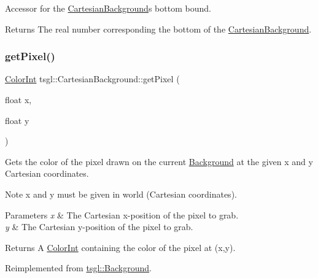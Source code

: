 Accessor for the \hyperlink{classtsgl_1_1_cartesian_background}{Cartesian\+Background}\textquotesingle{}s bottom bound. 

\begin{DoxyReturn}{Returns}
The real number corresponding the bottom of the \hyperlink{classtsgl_1_1_cartesian_background}{Cartesian\+Background}. 
\end{DoxyReturn}
\mbox{\label{classtsgl_1_1_cartesian_background_a36a3e803d2ffe16e2e1639359f7c7be5}} 
\subsubsection{\texorpdfstring{get\+Pixel()}{getPixel()}}
{\footnotesize\ttfamily \hyperlink{structtsgl_1_1_color_int}{Color\+Int} tsgl\+::\+Cartesian\+Background\+::get\+Pixel (\begin{DoxyParamCaption}\item[{float}]{x,  }\item[{float}]{y }\end{DoxyParamCaption})\hspace{0.3cm}{\ttfamily [virtual]}}



Gets the color of the pixel drawn on the current \hyperlink{classtsgl_1_1_background}{Background} at the given x and y Cartesian coordinates. 

\begin{DoxyNote}{Note}
x and y must be given in world (Cartesian coordinates). 
\end{DoxyNote}

\begin{DoxyParams}{Parameters}
{\em x} & The Cartesian x-\/position of the pixel to grab. \\
\hline
{\em y} & The Cartesian y-\/position of the pixel to grab. \\
\hline
\end{DoxyParams}
\begin{DoxyReturn}{Returns}
A \hyperlink{structtsgl_1_1_color_int}{Color\+Int} containing the color of the pixel at (x,y). 
\end{DoxyReturn}


Reimplemented from \hyperlink{classtsgl_1_1_background_a09d91731095fd0839eaf6e46c3d279b5}{tsgl\+::\+Background}.



